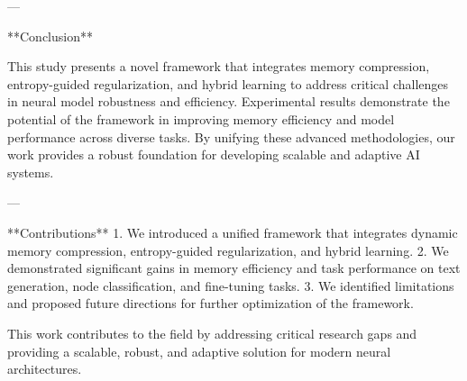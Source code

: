 ---

**Conclusion**  

This study presents a novel framework that integrates memory compression, entropy-guided regularization, and hybrid learning to address critical challenges in neural model robustness and efficiency. Experimental results demonstrate the potential of the framework in improving memory efficiency and model performance across diverse tasks. By unifying these advanced methodologies, our work provides a robust foundation for developing scalable and adaptive AI systems.  

---

**Contributions**  
1. We introduced a unified framework that integrates dynamic memory compression, entropy-guided regularization, and hybrid learning.  
2. We demonstrated significant gains in memory efficiency and task performance on text generation, node classification, and fine-tuning tasks.  
3. We identified limitations and proposed future directions for further optimization of the framework.  

This work contributes to the field by addressing critical research gaps and providing a scalable, robust, and adaptive solution for modern neural architectures.